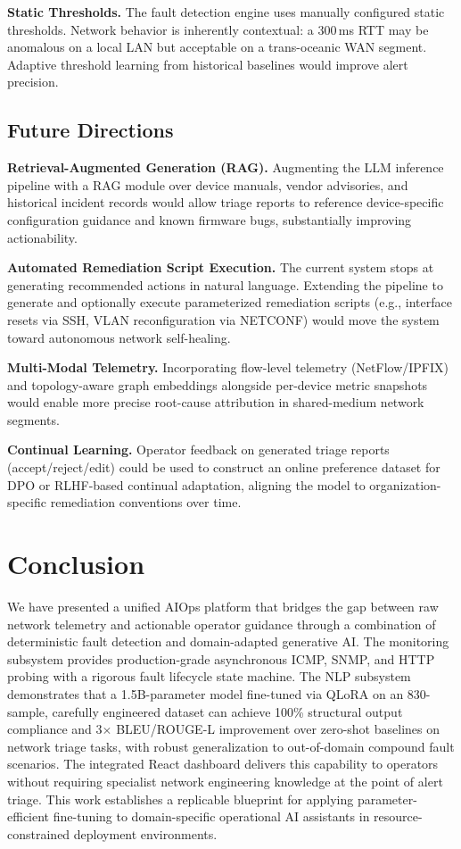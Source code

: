 \documentclass[conference]{IEEEtran}
\begin{document}
\textbf{Static Thresholds.} The fault detection engine uses manually configured static thresholds. Network behavior is inherently contextual: a 300\,ms RTT may be anomalous on a local LAN but acceptable on a trans-oceanic WAN segment. Adaptive threshold learning from historical baselines would improve alert precision.

\subsection{Future Directions}

\textbf{Retrieval-Augmented Generation (RAG).} Augmenting the LLM inference pipeline with a RAG module over device manuals, vendor advisories, and historical incident records would allow triage reports to reference device-specific configuration guidance and known firmware bugs, substantially improving actionability.

\textbf{Automated Remediation Script Execution.} The current system stops at generating recommended actions in natural language. Extending the pipeline to generate and optionally execute parameterized remediation scripts (e.g., interface resets via SSH, VLAN reconfiguration via NETCONF) would move the system toward autonomous network self-healing.

\textbf{Multi-Modal Telemetry.} Incorporating flow-level telemetry (NetFlow/IPFIX) and topology-aware graph embeddings alongside per-device metric snapshots would enable more precise root-cause attribution in shared-medium network segments.

\textbf{Continual Learning.} Operator feedback on generated triage reports (accept/reject/edit) could be used to construct an online preference dataset for DPO or RLHF-based continual adaptation, aligning the model to organization-specific remediation conventions over time.

\section{Conclusion}
\label{sec:conclusion}

We have presented a unified AIOps platform that bridges the gap between raw network telemetry and actionable operator guidance through a combination of deterministic fault detection and domain-adapted generative AI. The monitoring subsystem provides production-grade asynchronous ICMP, SNMP, and HTTP probing with a rigorous fault lifecycle state machine. The NLP subsystem demonstrates that a 1.5B-parameter model fine-tuned via QLoRA on an 830-sample, carefully engineered dataset can achieve 100\% structural output compliance and 3$\times$ BLEU/ROUGE-L improvement over zero-shot baselines on network triage tasks, with robust generalization to out-of-domain compound fault scenarios. The integrated React dashboard delivers this capability to operators without requiring specialist network engineering knowledge at the point of alert triage. This work establishes a replicable blueprint for applying parameter-efficient fine-tuning to domain-specific operational AI assistants in resource-constrained deployment environments.
\end{document}
